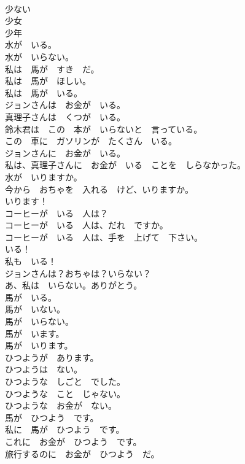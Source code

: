 \documentclass[8pt]{extreport}
\begin{document}
\begin{CJK}{UTF8}{min}
\\	少ない	
\\	少女	
\\	少年	
\\	水が　いる。	
\\	水が　いらない。	
\\	私は　馬が　すき　だ。	
\\	私は　馬が　ほしい。	
\\	私は　馬が　いる。	
\\	ジョンさんは　お金が　いる。	
\\	真理子さんは　くつが　いる。	
\\	鈴木君は　この　本が　いらないと　言っている。	
\\	この　車に　ガソリンが　たくさん　いる。	
\\	ジョンさんに　お金が　いる。	
\\	私は、真理子さんに　お金が　いる　ことを　しらなかった。	
\\	水が　いりますか。	
\\	今から　おちゃを　入れる　けど、いりますか。	
\\	いります！	
\\	コーヒーが　いる　人は？	
\\	コーヒーが　いる　人は、だれ　ですか。	
\\	コーヒーが　いる　人は、手を　上げて　下さい。	
\\	いる！	
\\	私も　いる！	
\\	ジョンさんは？おちゃは？いらない？	
\\	あ、私は　いらない。ありがとう。	
\\	馬が　いる。	
\\	馬が　いない。	
\\	馬が　いらない。	
\\	馬が　います。	
\\	馬が　いります。	
\\	ひつようが　あります。	
\\	ひつようは　ない。	
\\	ひつような　しごと　でした。	
\\	ひつような　こと　じゃない。	
\\	ひつような　お金が　ない。	
\\	馬が　ひつよう　です。	
\\	私に　馬が　ひつよう　です。	
\\	これに　お金が　ひつよう　です。	
\\	旅行するのに　お金が　ひつよう　だ。	

\end{CJK}
\end{document}
